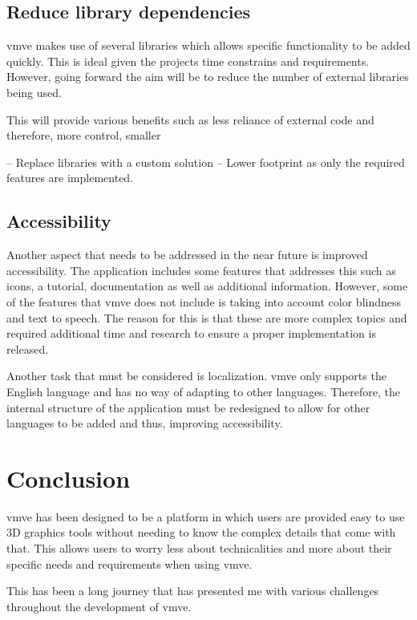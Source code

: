 \documentclass[11pt]{article}
\begin{document}
\subsection{Reduce library dependencies}
\gls{vmve} makes use of several libraries which allows specific functionality to be
added quickly. This is ideal given the projects time constrains and
requirements. However, going forward the aim will be to reduce the number of
external libraries being used.

This will provide various benefits such as less reliance of external code and
therefore, more control, smaller 


-- Replace libraries with a custom solution --
Lower footprint as only the required features are implemented.

\subsection{Accessibility}
Another aspect that needs to be addressed in the near future is improved
accessibility. The application includes some features that addresses this such
as icons, a tutorial, documentation as well as additional information. However,
some of the features that \gls{vmve} does not include is taking into account
color blindness and text to speech. The reason for this is that these are more
complex topics and required additional time and research to ensure a proper 
implementation is released.

Another task that must be considered is localization. \gls{vmve} only supports
the English language and has no way of adapting to other languages. Therefore,
the internal structure of the application must be redesigned to allow for
other languages to be added and thus, improving accessibility.

\section{Conclusion}

\gls{vmve} has been designed to be a platform in which users are provided easy to use
3D graphics tools without needing to know the complex details that come with
that. This allows users to worry less about technicalities and more about their
specific needs and requirements when using \gls{vmve}.

This has been a long journey that has presented me with various challenges
throughout the development of \gls{vmve}.


\clearpage
\printnoidxglossary
\end{document}
